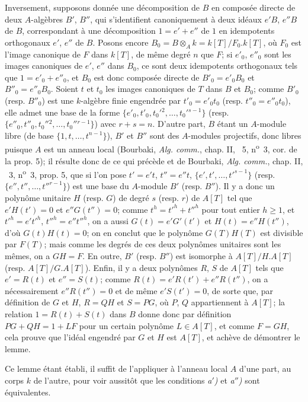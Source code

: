 Inversement, supposons donnée une décomposition de $B$ en composée directe de deux $A$-algèbres $B'$, $B''$, qui s'identifient canoniquement à deux idéaux $e'B$, $e''B$ de $B$, correspondant à une décomposition $1=e'+e''$ de $1$ en idempotents orthogonaux $e'$, $e''$ de $B$. Posons encore $B_0=B\otimes_A k=k[T]/F_0.k[T]$, où $F_0$ est l'image canonique de $F$ dans $k[T]$, de même degré $n$ que $F$; si $e'_0$, $e''_0$ sont les images canoniques de $e'$, $e''$ dans $B_0$, ce sont deux idempotents orthogonaux tels que $1=e'_0+e''_0$, et $B_0$ est donc composée directe de $B'_0=e'_0B_0$ et $B''_0=e''_0B_0$. Soient $t$ et $t_0$ les images canoniques de $T$ dans $B$ et $B_0$; comme $B'_0$ (resp. $B''_0$) est une $k$-algèbre finie engendrée par $t'_0=e'_0t_0$ (resp. $t''_0=e''_0t_0$), elle admet une base de la forme $\{e'_0,t'_0,t_0'{}^2,\ldots,t_0'{}^{s-1}\}$ (resp. $\{e''_0,t''_0,t_0''{}^2,\ldots,t_0''{}^{r-1}\}$) avec $r+s=n$. D'autre part, $B$ étant un $A$-module libre (de base $\{1,t,\ldots,t^{n-1}\}$), $B'$ et $B''$ sont des $A$-modules projectifs, donc libres puisque $A$ est un anneau local (Bourbaki, \emph{Alg. comm.}, chap. II, \textsection~5, n\textsuperscript{o}~3, cor. de la prop. 5); il résulte donc de ce qui précède et de Bourbaki, \emph{Alg. comm.}, chap. II, \textsection~3, n\textsuperscript{o}~3, prop. 5, que si l'on pose $t'=e't$, $t''=e''t$, $\{e',t',\ldots,t'^{s-1}\}$ (resp. $\{e'',t'',\ldots,t''^{r-1}\}$) est une base du $A$-module $B'$ (resp. $B''$). Il y a donc un polynôme unitaire $H$ (resp. $G$) de degré $s$ (resp. $r$) de $A[T]$ tel que $e'H(t')=0$ et $e''G(t'')=0$; comme $t^h=t'^h+t''^h$ pour tout entier $h\geq1$, et $t'^h=e't'^h$, $t''^h=e''t''^h$, on a aussi $G(t)=e'G'(t')$ et $H(t)=e''H(t'')$, d'où $G(t)H(t)=0$; on en conclut que le polynôme $G(T)H(T)$ est divisible par $F(T)$; mais comme les degrés de ces deux polynômes unitaires sont les mêmes, on a $GH=F$. En outre, $B'$ (resp. $B''$) est isomorphe à $A[T]/H.A[T]$ (resp. $A[T]/G.A[T]$). Enfin, il y a deux polynômes $R$, $S$ de $A[T]$ tels que $e'=R(t)$ et $e''=S(t)$; comme $R(t)=e'R(t')+e''R(t'')$, on a nécessairement $e''R(t'')=0$ et de même $e'S(t')=0$, de sorte que, par définition de $G$ et $H$, $R=QH$ et $S=PG$, où $P$, $Q$ appartiennent à $A[T]$; la relation $1=R(t)+S(t)$ dans $B$ donne donc par définition $PG+QH=1+LF$ pour un certain polynôme $L\in A[T]$, et comme $F=GH$, cela prouve que l'idéal engendré par $G$ et $H$ est $A[T]$, et achève de démontrer le lemme.

Ce lemme étant établi, il suffit de l'appliquer à l'anneau local $A$ d'une part, au corps $k$ de l'autre, pour voir aussitôt que les conditions \emph{a$'$)} et \emph{a$''$)} sont équivalentes.

